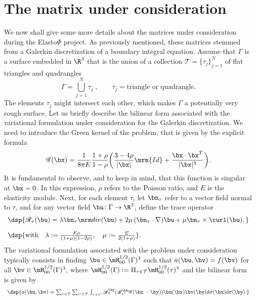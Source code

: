 


\section{The matrix under consideration}\label{sec:GalerkinMatrix}

We now shall give some more details about the matrices under consideration during the Elasto$\Phi$ project. 
As previously mentioned, these matrices stemmed from a Galerkin discretization of a boundary integral 
equation. Assume that $\Gamma$ is a surface embedded in $\R^{3}$ that is the union of a collection 
$\mathcal{T} = \{\tau_{j}\}_{j=1}^{N}$ of flat triangles and quadrangles
\[
\Gamma = \mathop{\bigcup}_{j=1}^{N}\tau_{j}\;,\quad\quad \tau_{j} = \textrm{triangle or quadrangle}.
\]
The elements $\tau_{j}$ might intersect each other, which makes $\Gamma$ a potentially very rough surface.
Let us briefly describe the bilinear form associated with the variational formulation under consideration for 
the Galerkin discretization. We need to introduce the Green kernel of the problem, that is given by the explicit formula 
\[
\mathscr{G}(\bx) = \frac{1}{8\pi E}\frac{1+\rho}{1-\rho}\biggl( \frac{3-4\rho}{\vert \bx\vert}\mrm{Id}  +\frac{\bx\cdot\bx^{T}}{\vert \bx\vert^{3}}\biggr).
\]
It is fundamental to observe, and to keep in mind, that this function is singular at $\bx = 0$. In this expression, $\rho$ 
refers to the Poisson ratio, and $E$ is the elasticity module. Next, for each element $\tau$, let  $\bn_{\tau}$ refer to a vector field 
normal to $\tau$, and for any vector field $\bu\colon\Gamma\to \R^{3}$, define the trace operator
\[
\begin{array}{l}
\dsp{ \mathscr{R}_{\tau}(\bu) = \lambda\bn_{\tau}\div(\bu)+2\mu\,(\bn_{\tau}\cdot\nabla)\bu + \mu\bn_{\tau}\times\curl(\bu), }\\[10pt]
\dsp{ \textrm{with}\quad \lambda := \frac{E\rho}{(1+\mu)(1-2\rho)},\quad \mu := \frac{E}{2(1+\rho)}}.
\end{array}
\]
The variational formulation associated with the problem under consideration typically consists in finding $\bu\in \mH^{1/2}_{00}(\Gamma)^{3}$ 
such that $a(\bu,\bv) = f(\bv)$ for all $\bv\in \mH^{1/2}_{00}(\Gamma)^{3}$, where $\mH^{1/2}_{00}(\Gamma):=\Pi_{\tau\in\mathcal{T}}\mH^{1/2}_{00}(\tau)^{3}$
and the bilinear form is given by
\begin{equation}\label{VariationnalFormulation}
\begin{array}{l}
\dsp{ a(\bu,\bv) = \sum_{\tau\in\mathcal{T}}\sum_{\tau'\in\mathcal{T}}\int_{\tau\times\tau'}\mathscr{R}_{\tau}^{\by}(\mathscr{R}_{\tau'}^{\bx}\mathscr{G}(\bx-\by)) \bu(\bx)\bv(\by) d\sigma(\bx) d\sigma(\by).  }
\end{array}
\end{equation}
